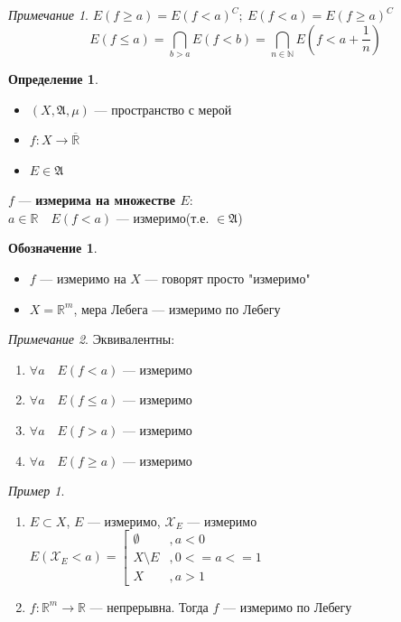 \documentclass[oneside]{book}
\newcommand{\R}{\mathbb{R}}
\newcommand{\N}{\mathbb{N}}
\newcommand{\A}{\mathfrak{A}}
\theoremstyle{plain}
\theoremstyle{remark}
\newtheorem*{remark}{Примечание}
\newtheorem*{examp}{Пример}
\theoremstyle{definition}
\newtheorem*{definition}{Определение}
\newtheorem*{symb}{Обозначение}
\begin{document}
\begin{remark}
\(E(f \ge a) = E(f < a)^C;\ E(f < a) = E(f \ge a)^C\) \\
\[ E(f \le a) = \bigcap_{b > a} E(f < b) = \bigcap_{n \in \N}E(f < a + \frac{1}{n})\]
\label{org88d9991}
\end{remark}
\begin{definition}
\-
\begin{itemize}
\item \((X, \A, \mu)\) --- пространство с мерой
\item \(f: X \to \overline{\R}\)
\item \(E \in \A\)
\end{itemize}
\(f\) --- \textbf{измерима на множестве \(E\)}: \\
\(a \in \R\quad E(f < a)\) --- измеримо(т.е. \(\in \A\))
\label{org073efac}
\end{definition}
\begin{symb}
\-
\begin{itemize}
\item \(f\) --- измеримо на \(X\) --- говорят просто "измеримо"
\item \(X = \R^m\), мера Лебега --- измеримо по Лебегу
\end{itemize}
\label{org9d58d0d}
\end{symb}
\begin{remark}
Эквивалентны:
\begin{enumerate}
\item \(\forall a\quad E(f < a)\) --- измеримо
\item \(\forall a\quad E(f \le a)\) --- измеримо
\item \(\forall a\quad E(f > a)\) --- измеримо
\item \(\forall a\quad E(f \ge a)\) --- измеримо
\end{enumerate}
\label{org7fa37d8}
\end{remark}
\begin{examp}
\begin{enumerate}
\item \(E \subset X\), \(E\) --- измеримо, \(\mathcal{X}_E\) --- измеримо \\
\(E(\mathcal{X}_E < a) = \left[\begin{array}{ll} \emptyset & ,a < 0 \\ X \setminus E & ,0 <= a <= 1 \\ X & ,a > 1 \end{array}\)
\item \(f: \R^m \to \R\) --- непрерывна. Тогда \(f\) --- измеримо по Лебегу
\end{enumerate}
\label{orgba9e6ee}
\end{examp}
\end{document}
